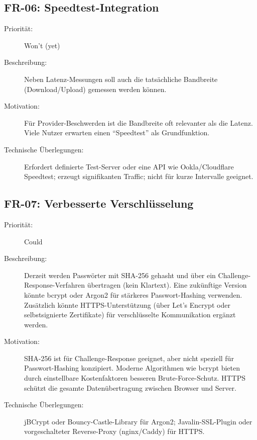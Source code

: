 \subsection{FR-06: Speedtest-Integration}
\begin{description}
  \item[Priorität:] Won't (yet)
  \item[Beschreibung:] Neben Latenz-Messungen soll auch die tatsächliche Bandbreite
    (Download/Upload) gemessen werden können.
  \item[Motivation:] Für Provider-Beschwerden ist die Bandbreite oft relevanter als die
    Latenz. Viele Nutzer erwarten einen \enquote{Speedtest} als Grundfunktion.
  \item[Technische Überlegungen:] Erfordert definierte Test-Server oder eine API wie
    Ookla/Cloudflare Speedtest; erzeugt signifikanten Traffic; nicht für kurze Intervalle
    geeignet.
\end{description}

\subsection{FR-07: Verbesserte Verschlüsselung}
\begin{description}
  \item[Priorität:] Could
  \item[Beschreibung:] Derzeit werden Passwörter mit SHA-256 gehasht und über ein
    Challenge-Response-Verfahren übertragen (kein Klartext). Eine zukünftige
    Version könnte bcrypt oder Argon2 für stärkeres Passwort-Hashing verwenden.
    Zusätzlich könnte HTTPS-Unterstützung (über Let's Encrypt oder selbstsignierte
    Zertifikate) für verschlüsselte Kommunikation ergänzt werden.
  \item[Motivation:] SHA-256 ist für Challenge-Response geeignet, aber nicht speziell
    für Passwort-Hashing konzipiert. Moderne Algorithmen wie bcrypt bieten durch
    einstellbare Kostenfaktoren besseren Brute-Force-Schutz. HTTPS schützt die
    gesamte Datenübertragung zwischen Browser und Server.
  \item[Technische Überlegungen:] jBCrypt oder Bouncy-Castle-Library für Argon2;
    Javalin-SSL-Plugin oder vorgeschalteter Reverse-Proxy (nginx/Caddy) für HTTPS.
\end{description}

